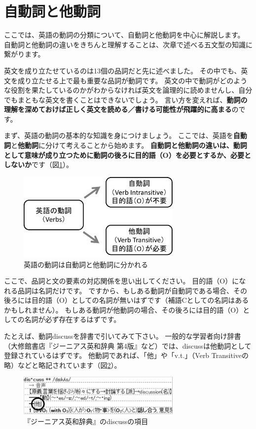\documentclass[12pt,titlepage]{jsarticle}
\begin{document}
  \newpage
 \section{自動詞と他動詞}
 ここでは、英語の動詞の分類について、自動詞と他動詞を中心に解説します。
 自動詞と他動詞の違いをきちんと理解することは、次章で述べる五文型の知識に繋がります。

 英文を成り立たせているのは13個の品詞だと先に述べました。
 その中でも、英文を成り立たせる上で最も重要な品詞が動詞です。
 英文の中で動詞がどのような役割を果たしているのかがわからなければ英文を論理的に読めませんし、自分でもまともな英文を書くことはできないでしょう。
 言い方を変えれば、{\bf 動詞の理解を深めておけば正しく英文を読める／書ける可能性が飛躍的に高まる}のです。

 まず、英語の動詞の基本的な知識を身につけましょう。
 ここでは、英語を{\bf 自動詞}と{\bf 他動詞}に分けて考えることから始めます。
 {\bf 自動詞と他動詞の違いは、動詞として意味が成り立つために動詞の後ろに目的語（O）を必要とするか、必要としないか}です（図\ref{fig7}）。
  \begin{figure}[htbp]
   \begin{center}
    \includegraphics[width=8cm]{./figure/fig7.pdf}
    \caption{英語の動詞は自動詞と他動詞に分かれる}
    \label{fig7}
   \end{center}
  \end{figure}

  ここで、品詞と文の要素の対応関係を思い出してください。
  目的語（O）になれる品詞は名詞だけです。
  ですから、もしある動詞が自動詞である場合、その後ろには目的語（O）としての名詞が無いはずです（補語Cとしての名詞はあるかもしれません）。
  もしある動詞が他動詞の場合、その後ろには目的語（O）としての名詞が必ず存在するはずです。

  たとえば、動詞discussを辞書で引いてみて下さい。
  一般的な学習者向け辞書（大修館書店『ジーニアス英和辞典 第4版』など）では、discussは他動詞として登録されているはずです。
  他動詞であれば、「他」や「v.t.」（Verb Transitiveの略）などと略記されています（図\ref{fig8}）。
  \begin{figure}[htbp]
   \begin{center}
    \includegraphics[width=8cm]{./figure/fig8.pdf}
    \caption{『ジーニアス英和辞典』のdiscussの項目}
    \label{fig8}
   \end{center}
  \end{figure}
\end{document}
